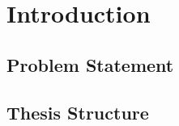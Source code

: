 \documentclass[../thesis.tex]{subfiles}
\begin{document}
\chapter{Introduction}

\lipsum

\section{Problem Statement}

\section{Thesis Structure}
\end{document}
